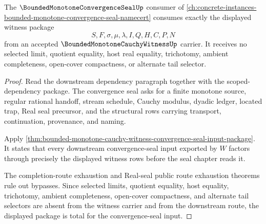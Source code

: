 \begin{theorem}
\label{thm:bounded-monotone-cauchy-witness-convergence-seal-input-totality}
The $\BoundedMonotoneConvergenceSealUp$ consumer of \autoref{ch:concrete-instances-bounded-monotone-convergence-seal-namecert} consumes exactly the displayed witness package
$$
S,F,\sigma,\mu,\lambda,I,Q,H,C,P,N
$$
from an accepted $\BoundedMonotoneCauchyWitnessUp$ carrier. It receives no selected limit, quotient equality, host real equality, trichotomy, ambient completeness, open-cover compactness, or alternate tail selector.
\end{theorem}
\begin{proof}
Read the downstream dependency paragraph together with the scoped-dependency package. The convergence seal asks for a finite monotone source, regular rational handoff, stream schedule, Cauchy modulus, dyadic ledger, located trap, Real seal precursor, and the structural rows carrying transport, continuation, provenance, and naming.

Apply \autoref{thm:bounded-monotone-cauchy-witness-convergence-seal-input-package}. It states that every downstream convergence-seal input exported by $W$ factors through precisely the displayed witness rows before the seal chapter reads it.

The completion-route exhaustion and Real-seal public route exhaustion theorems rule out bypasses. Since selected limits, quotient equality, host equality, trichotomy, ambient completeness, open-cover compactness, and alternate tail selectors are absent from the witness carrier and from the downstream route, the displayed package is total for the convergence-seal input.
\end{proof}

